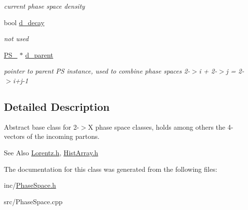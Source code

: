 \begin{DoxyCompactItemize}
\begin{DoxyCompactList}\small\item\em current phase space density \end{DoxyCompactList}\item 
\hypertarget{classPS__2_a973be656af67bb3516424e664a49ae55}{bool \hyperlink{classPS__2_a973be656af67bb3516424e664a49ae55}{d\-\_\-decay}}\label{classPS__2_a973be656af67bb3516424e664a49ae55}

\begin{DoxyCompactList}\small\item\em not used \end{DoxyCompactList}\item 
\hypertarget{classPS__2_abebb860c3c4a1c5054bc223d3aac4f45}{\hyperlink{classPS__2}{P\-S\-\_} $\ast$ \hyperlink{classPS__2_abebb860c3c4a1c5054bc223d3aac4f45}{d\-\_\-parent}}\label{classPS__2_abebb860c3c4a1c5054bc223d3aac4f45}

\begin{DoxyCompactList}\small\item\em pointer to parent P\-S instance, used to combine phase spaces 2-\/$>$i + 2-\/$>$j = 2-\/$>$i+j-\/1 \end{DoxyCompactList}\end{DoxyCompactItemize}


\subsection{Detailed Description}
Abstract base class for 2-\/$>$X phase space classes, holds among others the 4-\/vectors of the incoming partons. \begin{DoxySeeAlso}{See Also}
\hyperlink{Lorentz_8h_source}{Lorentz.\-h}, \hyperlink{HistArray_8h}{Hist\-Array.\-h} 
\end{DoxySeeAlso}


The documentation for this class was generated from the following files\-:\begin{DoxyCompactItemize}
\item 
inc/\hyperlink{PhaseSpace_8h}{Phase\-Space.\-h}\item 
src/Phase\-Space.\-cpp\end{DoxyCompactItemize}
